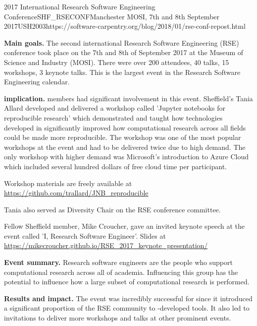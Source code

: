 \begin{event}{2017 International Research Software Engineering Conference}{SHF_RSECONF}{Manchester MOSI, 7th and 8th September 2017}{USH}{200}{3}{https://software-carpentry.org/blog/2018/01/rse-conf-repost.html}

\textbf{Main goals.} The second international Research Software Engineering (RSE) conference took place on the 7th and 8th of September 2017 at the Museum of Science and Industry (MOSI). There were over 200 attendees, 40 talks, 15 workshops, 3 keynote talks. This is the largest event in the Research Software Engineering calendar.

\textbf{\ODK implication.} \ODK members had significant involvement in this event. Sheffield's Tania Allard developed and delivered a workshop called 'Jupyter notebooks for reproducible research’ which demonstrated and taught how technologies developed in \ODK significantly improved how computational research across all fields could be made more reproducible.  The workshop was one of the most popular workshops at the event and had to be delivered twice due to high demand. The only workshop with higher demand was Microsoft's introduction to Azure Cloud which included several hundred dollars of free cloud time per participant.

Workshop materials are freely available at \url{https://github.com/trallard/JNB_reproducible}

Tania also served as Diversity Chair on the RSE conference committee.

Fellow Sheffield \ODK member, Mike Croucher, gave an invited keynote speech at the event called 'I, Research Software Engineer'. Slides at \url{https://mikecroucher.github.io/RSE_2017_keynote_presentation/}

\textbf{Event summary.} Research software engineers are the people who support computational research across all of academia. Influencing this group has the potential to influence how a large subset of computational research is performed.

\textbf{Results and impact.} The event was incredibly successful for \ODK since it introduced a significant proportion of the RSE community to \ODK-developed tools.  It also led to invitations to deliver more workshops and talks at other prominent events.

\end{event}
